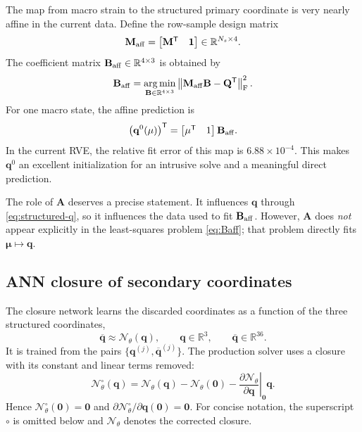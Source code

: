 \documentclass[11pt,a4paper]{article}
\newcommand{\R}{\mathbb{R}}
\newcommand{\transpose}{^{\mathsf T}}
\newcommand{\frobnorm}[1]{\left\lVert #1 \right\rVert_{\mathrm F}}
\newcommand{\vect}[1]{\mathbf{#1}}
\newcommand{\mat}[1]{\mathbf{#1}}
\begin{document}
The map from macro strain to the structured primary coordinate is very nearly
affine in the current data.  Define the row-sample design matrix
\begin{equation}
  \mat M_{\rm aff}
  =\begin{bmatrix}\mat M\transpose&\vect 1\end{bmatrix}
  \in\R^{N_s\times4}.
  \label{eq:maff}
\end{equation}
The coefficient matrix \(\mat B_{\rm aff}\in\R^{4\times3}\) is obtained by
\begin{equation}
  \mat B_{\rm aff}
  =\underset{\mat B\in\R^{4\times3}}
           {\operatorname*{arg\,min}}
   \frobnorm{\mat M_{\rm aff}\mat B-\mat Q\transpose}^{2}.
  \label{eq:Baff}
\end{equation}
For one macro state, the affine prediction is
\begin{equation}
  \left(\vect q^0(\vect\mu)\right)\transpose
  =\begin{bmatrix}\vect\mu\transpose&1\end{bmatrix}\mat B_{\rm aff}.
  \label{eq:q0}
\end{equation}
In the current RVE, the relative fit error of this map is
\(6.88\times10^{-4}\).  This makes \(\vect q^0\) an excellent initialization
for an intrusive solve and a meaningful direct prediction.

The role of \(\mat A\) deserves a precise statement.  It influences
\(\vect q\) through \cref{eq:structured-q}, so it influences the data used to
fit \(\mat B_{\rm aff}\).  However, \(\mat A\) does \emph{not} appear
explicitly in the least-squares problem \cref{eq:Baff}; that problem directly
fits \(\vect\mu\mapsto\vect q\).

\subsection{ANN closure of secondary coordinates}

The closure network learns the discarded coordinates as a function of the
three structured coordinates,
\begin{equation}
  \overline{\vect q}
  \approx\mathcal N_\theta(\vect q),
  \qquad
  \vect q\in\R^3,
  \qquad
  \overline{\vect q}\in\R^{36}.
  \label{eq:ann-closure}
\end{equation}
It is trained from the pairs
\(\{\vect q^{(j)},\overline{\vect q}^{(j)}\}\).  The production solver uses
a closure with its constant and linear terms removed:
\begin{equation}
  \mathcal N_\theta^{\circ}(\vect q)
  =\mathcal N_\theta(\vect q)-\mathcal N_\theta(\vect 0)
   -\left.\frac{\partial\mathcal N_\theta}{\partial\vect q}\right|_{\vect0}\vect q.
  \label{eq:origin-correction}
\end{equation}
Hence \(\mathcal N_\theta^{\circ}(\vect0)=\vect0\) and
\(\partial\mathcal N_\theta^{\circ}/\partial\vect q(\vect0)=\mat0\).
For concise notation, the superscript \(\circ\) is omitted below and
\(\mathcal N_\theta\) denotes the corrected closure.
\end{document}
